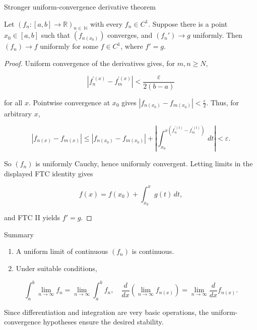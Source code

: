 \begin{theorem}{Stronger uniform-convergence derivative theorem}

Let \(\left( {f_{n}:\left\lbrack {a,b} \right\rbrack\rightarrow\mathbb{R}} \right)_{n \in \ \mathbb{N}}\) with every \(f_{n} \in C^{1}\). Suppose there is a point \(x_{0} \in \left\lbrack {a,b} \right\rbrack\) such that \(\left( f_{n{(x_{0})}} \right)\) converges, and \(\left( f_{n}' \right)\rightarrow g\) uniformly. Then \(\left( f_{n} \right)\rightarrow f\) uniformly for some \(f \in C^{1}\), where \(f' = g\).

\end{theorem}

\begin{proof}

Uniform convergence of the derivatives gives, for \(m,n \geq N\),

\[\left| {f_{n}^{'{(x)}} - f_{m}^{'{(x)}}} \right| < \frac{\varepsilon}{2\left( {b - a} \right)}\]

for all \(x\). Pointwise convergence at \(x_{0}\) gives \(\left| {f_{n{(x_{0})}} - f_{m{(x_{0})}}} \right| < \frac{\varepsilon}{2}\). Thus, for arbitrary \(x\),

\[\left| {f_{n{(x)}} - f_{m{(x)}}} \right| \leq \left| {f_{n{(x_{0})}} - f_{m{(x_{0})}}} \right| + \left| {\int_{x_{0}}^{x{({f_{n}^{'{(t)}} - f_{m}^{'{(t)}}})}}\, dt} \right| < \varepsilon.\]

So \(\left( f_{n} \right)\) is uniformly Cauchy, hence uniformly convergent. Letting limits in the displayed FTC identity gives

\[f(x) = f\left( x_{0} \right) + \int_{x_{0}}^{x}g(t)\, dt,\]

and FTC II yields \(f' = g\).

\end{proof}

\begin{qlremark}{Summary}

\begin{enumerate}
\tightlist
\item
  A uniform limit of continuous \(\left( f_{n} \right)\) is continuous.
\item
  Under suitable conditions,
\end{enumerate}

\[\int_{a}^{b}\lim\limits_{n\rightarrow\infty}f_{n} = \lim\limits_{n\rightarrow\infty}\int_{a}^{b}f_{n},\quad\frac{d}{dx}\left( {\lim\limits_{n\rightarrow\infty}f_{n{(x)}}} \right) = \lim\limits_{n\rightarrow\infty}\frac{d}{dx}f_{n{(x)}}.\]

Since differentiation and integration are very basic operations, the uniform-convergence hypotheses ensure the desired stability.

\end{qlremark}

